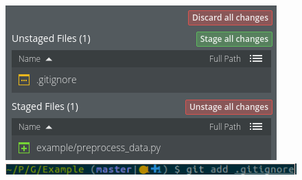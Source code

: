 \begin{frame}
\begin{columns}
\begin{column}{0.6\textwidth}
\begin{figure}
\begin{overprint}
				\includegraphics[width=\textwidth]{./pictures/ignored.png}
				\onslide<4>\includegraphics[width=\textwidth]{./pictures/add_gitignore.png}
			\end{overprint}
		\end{figure}
	\end{column}
	\end{columns}
\end{frame}
